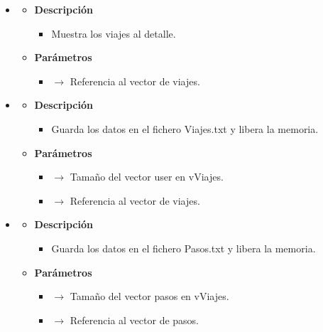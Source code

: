 \begin{itemize}
\begin{itemize}
\begin{itemize}
		\end{itemize}
	\end{itemize}
    \item {}
    \begin{itemize}
        \item \textbf{Descripción}
        \begin{itemize}
			\item  Muestra los viajes al detalle.
		\end{itemize}
		\item \textbf{Parámetros}
		\begin{itemize}
			\item {}  $\rightarrow$ Referencia al vector de viajes.
		\end{itemize}
	\end{itemize}
    \item {}
    \begin{itemize}
        \item \textbf{Descripción}
        \begin{itemize}
			\item  Guarda los datos en el fichero Viajes.txt y libera la memoria.
		\end{itemize}
		\item \textbf{Parámetros}
		\begin{itemize}
            \item {} $\rightarrow$ Tamaño del vector user en vViajes.
			\item {} $\rightarrow$ Referencia al vector de viajes.
		\end{itemize}
	\end{itemize}
    \newpage
    \item {}
    \begin{itemize}
        \item \textbf{Descripción}
        \begin{itemize}
			\item  Guarda los datos en el fichero Pasos.txt y libera la memoria.
		\end{itemize}
		\item \textbf{Parámetros}
		\begin{itemize}
            \item {} $\rightarrow$ Tamaño del vector pasos en vViajes.
			\item {} $\rightarrow$ Referencia al vector de pasos.

\end{itemize}
\end{itemize}
\end{itemize}
